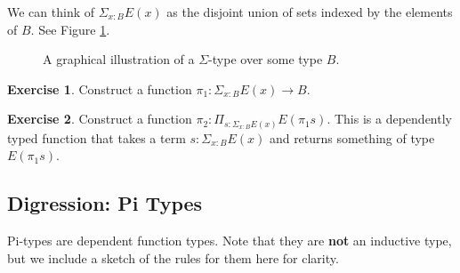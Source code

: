 \documentclass{amsart}
\theoremstyle{definition}
\newtheorem{ex}{Exercise}[section]
\begin{document}
We can think of $\Sigma_{x : B}E(x)$ as the disjoint union of sets indexed by the elements of $B$.
See Figure \ref{fig:sigma-type-as-total-space}.
\begin{figure}[h]
    \centering
    
    \caption{A graphical illustration of a $\Sigma$-type over some type $B$.}
    \label{fig:sigma-type-as-total-space}
\end{figure}

\begin{ex}
Construct a function $\pi_1 : \Sigma_{x : B} E(x) \to B$.
\end{ex}

\begin{ex}
Construct a function $\pi_2 : \Pi_{s : \Sigma_{x : B} E(x)} E(\pi_1 s)$. This is a dependently typed function that takes a term $s : \Sigma_{x : B} E(x)$ and returns something of type $E(\pi_1 s)$.
\end{ex}

\subsection{Digression: Pi Types}
Pi-types are dependent function types. 
Note that they are \textbf{not} an inductive type, but we include a sketch of the rules for them here for clarity.
\end{document}
